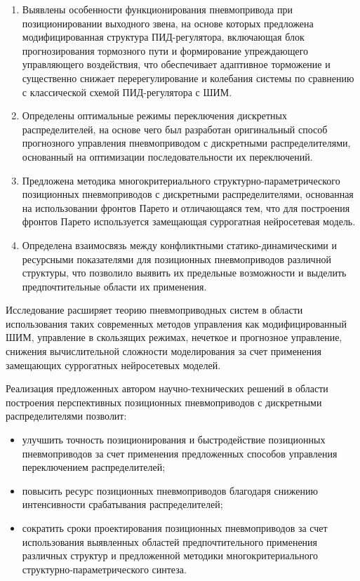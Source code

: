 {\novelty}
\begin{enumerate}[beginpenalty=10000] %

	\item Выявлены особенности функционирования пневмопривода при позиционировании выходного звена,
	      на основе которых предложена модифицированная структура ПИД-регулятора, включающая блок прогнозирования
	      тормозного пути и формирование упреждающего управляющего воздействия, что обеспечивает адаптивное торможение
	      и существенно снижает перерегулирование и колебания системы по сравнению с классической схемой ПИД-регулятора с ШИМ.

	\item Определены оптимальные режимы переключения дискретных распределителей, на основе
	      чего был разработан оригинальный способ прогнозного управления пневмоприводом с дискретными
	      распределителями, основанный на оптимизации последовательности их переключений.

	\item Предложена методика многокритериального структурно-\allowbreak па\-ра\-ме\-три\-че\-ско\-го 
	      позиционных пневмоприводов с дискретными распределителями, основанная на использовании
	      фронтов Парето и отличающаяся тем, что для построения фронтов Парето используется
	      замещающая суррогатная нейросетевая модель.

	\item Определена взаимосвязь между конфликтными статико-динамическими и ресурсными
	      показателями для позиционных пневмоприводов различной структуры, что позволило выявить
	      их предельные возможности и выделить предпочтительные области их применения.
\end{enumerate}

{\influenceTheoretical}
Исследование расширяет теорию пневмоприводных систем в области использования
таких современных методов управления как модифицированный ШИМ, управление
в скользящих режимах, нечеткое и прогнозное управление, снижения вычислительной
сложности моделирования за счет применения замещающих суррогатных нейросетевых моделей.

{\influencePractical}
Реализация предложенных автором научно-технических решений в области построения
перспективных позиционных пневмоприводов с дискретными распределителями позволит:

\begin{itemize}
	\item улучшить точность позиционирования и быстродействие позиционных пневмоприводов
	      за счет применения предложенных способов управления переключением распределителей;

	\item повысить ресурс позиционных пневмоприводов благодаря
	      снижению интенсивности срабатывания распределителей;

	\item сократить сроки проектирования позиционных пневмоприводов за счет использования
	      выявленных областей предпочтительного применения различных структур и
	      предложенной методики многокритериального структурно-параметрического синтеза.
\end{itemize}

